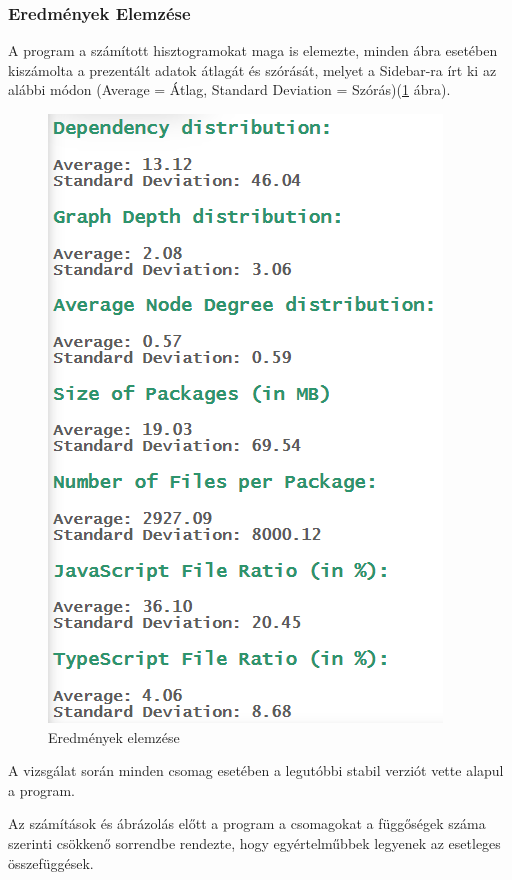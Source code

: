 \pagebreak

\subsubsection{Eredmények Elemzése}

A program a számított hisztogramokat maga is elemezte, minden ábra esetében kiszámolta a prezentált adatok átlagát és szórását, melyet a Sidebar-ra írt ki az alábbi módon (Average = Átlag, Standard Deviation = Szórás)(\ref{fig:hg_data} ábra).

\begin{figure}[!h]
	\centering
	\includegraphics[scale=0.35]{images/hg_data.png}
	\caption{Eredmények elemzése}
	\label{fig:hg_data}
\end{figure}

A vizsgálat során minden csomag esetében a legutóbbi stabil verziót vette alapul a program. 

Az számítások és ábrázolás előtt a program a csomagokat a függőségek száma szerinti csökkenő sorrendbe rendezte, hogy egyértelműbbek legyenek az esetleges összefüggések.

